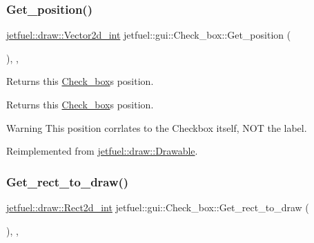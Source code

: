 \subsubsection{\texorpdfstring{Get\+\_\+position()}{Get\_position()}}
{\footnotesize\ttfamily \hyperlink{classjetfuel_1_1draw_1_1Vector2d}{jetfuel\+::draw\+::\+Vector2d\+\_\+int} jetfuel\+::gui\+::\+Check\+\_\+box\+::\+Get\+\_\+position (\begin{DoxyParamCaption}{ }\end{DoxyParamCaption})\hspace{0.3cm}{\ttfamily [inline]}, {\ttfamily [override]}, {\ttfamily [virtual]}}



Returns this \hyperlink{classjetfuel_1_1gui_1_1Check__box}{Check\+\_\+box}\textquotesingle{}s position. 

Returns this \hyperlink{classjetfuel_1_1gui_1_1Check__box}{Check\+\_\+box}\textquotesingle{}s position.

\begin{DoxyWarning}{Warning}
This position corrlates to the Checkbox itself, N\+OT the label. 
\end{DoxyWarning}


Reimplemented from \hyperlink{classjetfuel_1_1draw_1_1Drawable_ae7ebd30d66db2c8a5d5371cbcf0023fc}{jetfuel\+::draw\+::\+Drawable}.

\mbox{\label{classjetfuel_1_1gui_1_1Check__box_a09feae5781a788df462be6276e2d1c54}} 
\subsubsection{\texorpdfstring{Get\+\_\+rect\+\_\+to\+\_\+draw()}{Get\_rect\_to\_draw()}}
{\footnotesize\ttfamily \hyperlink{classjetfuel_1_1draw_1_1Rect2d}{jetfuel\+::draw\+::\+Rect2d\+\_\+int} jetfuel\+::gui\+::\+Check\+\_\+box\+::\+Get\+\_\+rect\+\_\+to\+\_\+draw (\begin{DoxyParamCaption}{ }\end{DoxyParamCaption})\hspace{0.3cm}{\ttfamily [inline]}, {\ttfamily [override]}, {\ttfamily [virtual]}}



